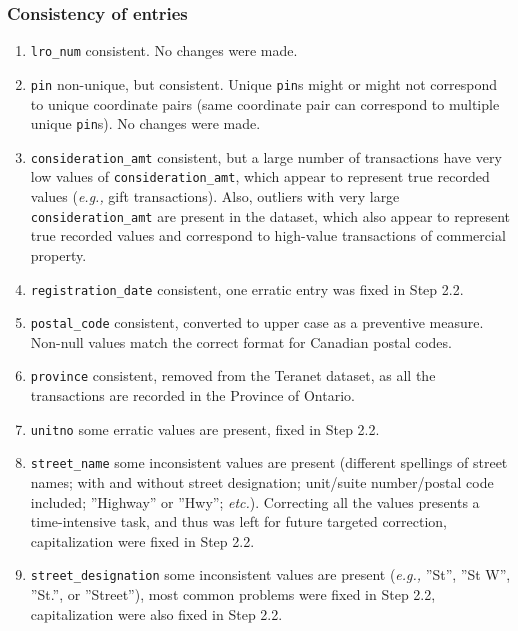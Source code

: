 \documentclass[11pt]{article}
\begin{document}
    \subsubsection{Consistency of entries} \label{subsubsec:teranet_consistency}

    \begin{enumerate}
        \item \texttt{lro\_num} \textemdash consistent.
        No changes were made.
        \item \texttt{pin} \textemdash non-unique, but consistent.
        Unique \texttt{pin}s might or might not correspond to unique coordinate pairs (same coordinate pair can correspond to multiple unique \texttt{pin}s).
        No changes were made.
        \item \texttt{consideration\_amt} \textemdash consistent, but a large number of transactions have very low values of \texttt{consideration\_amt}, which appear to represent true recorded values (\textit{e.g.,} gift transactions).
        Also, outliers with very large \texttt{consideration\_amt} are present in the dataset, which also appear to represent true recorded values and correspond to high-value transactions of commercial property.
        \item \texttt{registration\_date} \textemdash consistent, one erratic entry was fixed in Step 2.2.
        \item \texttt{postal\_code} \textemdash consistent, converted to upper case as a preventive measure.
        Non-null values match the correct format for Canadian postal codes.
        \item \texttt{province} \textemdash consistent, removed from the Teranet dataset, as all the transactions are recorded in the Province of Ontario.
        \item \texttt{unitno} \textemdash some erratic values are present, fixed in Step 2.2.
        \item \texttt{street\_name} \textemdash some inconsistent values are present (different spellings of street names;
        with and without street designation;
        unit/suite number/postal code included;
        ''Highway'' or ''Hwy''; \textit{etc.}).
        Correcting all the values presents a time-intensive task, and thus was left for future targeted correction, capitalization were fixed in Step 2.2.
        \item \texttt{street\_designation} \textemdash some inconsistent values are present (\textit{e.g.,} ''St'', ''St W'', ''St.'', or ''Street''), most common problems were fixed in Step 2.2, capitalization were also fixed in Step 2.2.

\end{enumerate}
\end{document}
